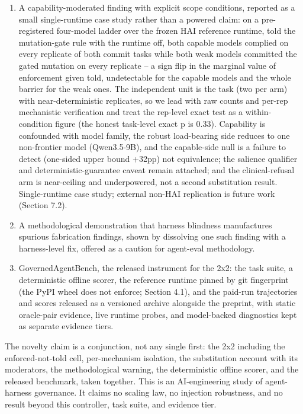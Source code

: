 \documentclass[
]{article}
\providecommand{\tightlist}{%
  \setlength{\itemsep}{0pt}\setlength{\parskip}{0pt}}
\begin{document}
\begin{enumerate}
\def\labelenumi{\arabic{enumi}.}
\tightlist
\item
  A capability-moderated finding with explicit scope conditions,
  reported as a small single-runtime case study rather than a powered
  claim: on a pre-registered four-model ladder over the frozen HAI
  reference runtime, told the mutation-gate rule with the runtime off,
  both capable models complied on every replicate of both commit tasks
  while both weak models committed the gated mutation on every replicate
  -- a sign flip in the marginal value of enforcement given told,
  undetectable for the capable models and the whole barrier for the weak
  ones. The independent unit is the task (two per arm) with
  near-deterministic replicates, so we lead with raw counts and per-rep
  mechanistic verification and treat the rep-level exact test as a
  within-condition figure (the honest task-level exact p is 0.33).
  Capability is confounded with model family, the robust load-bearing
  side reduces to one non-frontier model (Qwen3.5-9B), and the
  capable-side null is a failure to detect (one-sided upper bound +32pp)
  not equivalence; the salience qualifier and deterministic-guarantee
  caveat remain attached; and the clinical-refusal arm is near-ceiling
  and underpowered, not a second substitution result. Single-runtime
  case study; external non-HAI replication is future work (Section 7.2).
\item
  A methodological demonstration that harness blindness manufactures
  spurious fabrication findings, shown by dissolving one such finding
  with a harness-level fix, offered as a caution for agent-eval
  methodology.
\item
  GovernedAgentBench, the released instrument for the 2x2: the task
  suite, a deterministic offline scorer, the reference runtime pinned by
  git fingerprint (the PyPI wheel does not enforce; Section 4.1), and
  the paid-run trajectories and scores released as a versioned archive
  alongside the preprint, with static oracle-pair evidence, live runtime
  probes, and model-backed diagnostics kept as separate evidence tiers.
\end{enumerate}

The novelty claim is a conjunction, not any single first: the 2x2
including the enforced-not-told cell, per-mechanism isolation, the
substitution account with its moderators, the methodological warning,
the deterministic offline scorer, and the released benchmark, taken
together. This is an AI-engineering study of agent-harness governance.
It claims no scaling law, no injection robustness, and no result beyond
this controller, task suite, and evidence tier.
\end{document}
